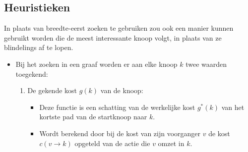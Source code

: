 \subsection{Heuristieken}
In plaats van breedte-eerst zoeken te gebruiken zou ook een manier kunnen gebruikt worden die de meest interessante knoop volgt, in plaats van ze blindelings af te lopen.
\begin{itemize}
	\item Bij het zoeken in een graaf worden er aan elke knoop $k$ twee waarden toegekend:
	\begin{enumerate}
		\item De gekende kost $g(k)$ van de knoop: 
		\begin{itemize}
			\item Deze functie is een schatting van de werkelijke kost $g^*(k)$ van het kortste  pad van de startknoop naar $k$.
			\item Wordt berekend door bij de kost van zijn voorganger $v$ de kost $c(v \rightarrow k)$ opgeteld van de actie die $v$ omzet in $k$.


\end{itemize}
\end{enumerate}
\end{itemize}
